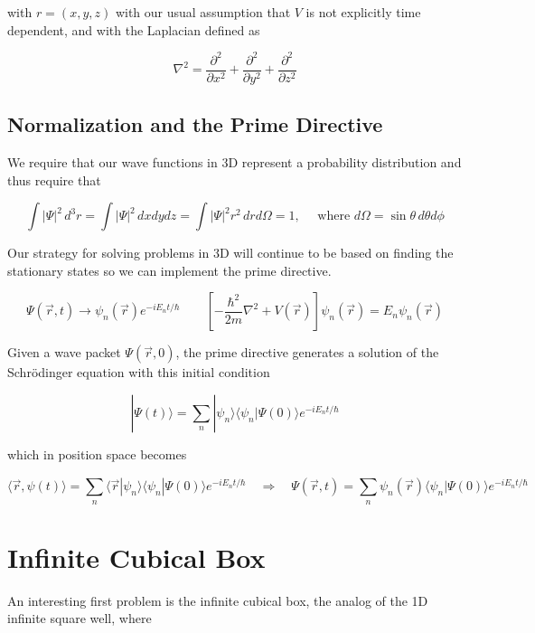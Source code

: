 with  $r = (x, y, z)$ with our usual assumption that $V$ is not explicitly time
dependent, and with the Laplacian defined as 

\[
 \nabla^2 = \frac{\partial^2 }{\partial x^2} + \frac{\partial^2 }{\partial y^2}
 + \frac{\partial^2 }{\partial z^2} 
\] \vspace{3px}

\subsection{Normalization and the Prime Directive} 

We require that our wave functions in 3D represent a probability distribution
and thus require that 

\[
\int |\Psi|^2 \, d^3r = \int |\Psi|^2 \, dxdydz = \int |\Psi|^2 r^2 \, dr
d\Omega = 1, \quad \text{ where } d\Omega = \sin\theta \, d\theta d\phi
\] \vspace{3px}

Our strategy for solving problems in 3D will continue to be based on finding
the stationary states so we can implement the prime directive. 

\[
  \Psi(\vec{r}, t) \rightarrow \psi_n(\vec{r}) e^{-iE_n t / \hbar} \qquad
  \left[ -\frac{\hbar^2}{2m} \nabla^2 + V(\vec{r}) \right] \psi_n(\vec{r})
  = E_n \psi_n(\vec{r})
\] \vspace{3px}

Given a wave packet $\Psi(\vec{r}, 0)$, the prime directive generates
a solution of the Schr\"odinger equation with this initial condition 

\[
|\Psi(t)\rangle = \sum_{n}^{} |\psi_n\rangle \langle \psi_n| \Psi(0) \rangle
e^{-iE_n t /\hbar}
\] \vspace{3px}

which in position space becomes 

\[
\langle \vec{r}, \psi(t) \rangle = \sum_{n}^{} \langle \vec{r} | \psi_n\rangle
\langle \psi_n | \Psi(0) \rangle e^{-iE_nt/\hbar} \quad \Rightarrow \quad
\Psi(\vec{r}, t) = \sum_{n}^{} \psi_n(\vec{r}) \langle \psi_n | \Psi(0) \rangle
e^{-iE_n t / \hbar}
\] \vspace{3px}

\section{Infinite Cubical Box}

An interesting first problem is the infinite cubical box, the analog of the 1D
infinite square well, where 

